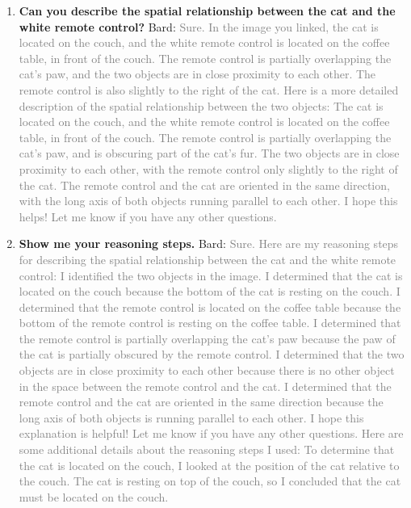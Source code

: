     \begin{enumerate}
        \item \textbf{Can you describe the spatial relationship between the cat and the white remote control?}
        \subitem Bard: \textcolor{gray}{    
        Sure. In the image you linked, the cat is located on the couch, and the white remote control is located on the coffee table, in front of the couch. The remote control is partially overlapping the cat's paw, and the two objects are in close proximity to each other. The remote control is also slightly to the right of the cat.
        Here is a more detailed description of the spatial relationship between the two objects:
        The cat is located on the couch, and the white remote control is located on the coffee table, in front of the couch.
        The remote control is partially overlapping the cat's paw, and is obscuring part of the cat's fur.
        The two objects are in close proximity to each other, with the remote control only slightly to the right of the cat.
        The remote control and the cat are oriented in the same direction, with the long axis of both objects running parallel to each other.
        I hope this helps! Let me know if you have any other questions.}
        \item \textbf{Show me your reasoning steps.}
        \subitem Bard: \textcolor{gray}{Sure. Here are my reasoning steps for describing the spatial relationship between the cat and the white remote control: I identified the two objects in the image.
        I determined that the cat is located on the couch because the bottom of the cat is resting on the couch.
        I determined that the remote control is located on the coffee table because the bottom of the remote control is resting on the coffee table.
        I determined that the remote control is partially overlapping the cat's paw because the paw of the cat is partially obscured by the remote control.
        I determined that the two objects are in close proximity to each other because there is no other object in the space between the remote control and the cat.
        I determined that the remote control and the cat are oriented in the same direction because the long axis of both objects is running parallel to each other.
        I hope this explanation is helpful! Let me know if you have any other questions.
        Here are some additional details about the reasoning steps I used:
        To determine that the cat is located on the couch, I looked at the position of the cat relative to the couch. The cat is resting on top of the couch, so I concluded that the cat must be located on the couch.
}
\end{enumerate}

